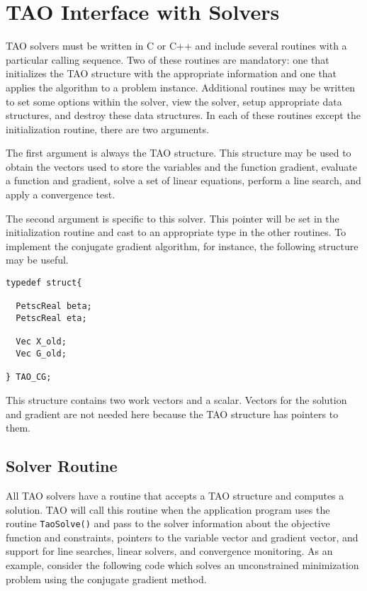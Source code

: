 \section{TAO Interface with Solvers}
TAO solvers must be written in C or C++ and include several routines with
a particular calling sequence.  Two of these routines are mandatory:
one that initializes the TAO structure with the appropriate information
and one that applies the algorithm to a problem instance.
Additional routines may be written to set some options within the
solver, view the solver, setup appropriate data structures, and destroy
these data structures.
In each of these routines except the initialization routine, 
there are two arguments.  

The first argument
is always the TAO structure.  This structure may be used to obtain the
vectors used to store the variables and the function gradient, evaluate
a function and gradient, solve a set of linear equations, perform a line 
search, and apply a convergence test.

The second argument is specific to this solver.  This pointer will be set
in  the initialization routine and cast to an appropriate type in
the other routines.  To implement the conjugate
gradient algorithm, for instance, the following structure may
be useful.
\begin{verbatim}
typedef struct{

  PetscReal beta;
  PetscReal eta;

  Vec X_old;
  Vec G_old; 

} TAO_CG;
\end{verbatim}
This structure contains two work vectors and a scalar.  Vectors
for the solution and gradient are not needed here because the TAO
structure has pointers to them.

\subsection{Solver Routine}
All TAO solvers have a routine that accepts a TAO structure and
computes a solution.  
TAO will call this routine when the application
program uses the routine {\tt TaoSolve()} and pass to the solver
information
about the objective function and constraints, pointers to the
variable vector and gradient vector, and support for line searches,
linear solvers, and convergence monitoring.  As an example, consider
the following code which solves an unconstrained minimization problem
using the conjugate gradient method.

